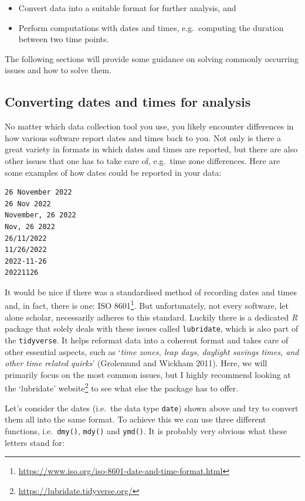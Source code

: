 \documentclass[
  letterpaper,
]{krantz}
\renewcommand{\href}[2]{#2\footnote{\url{#1}}}
\begin{document}
\begin{itemize}
\item
  Convert data into a suitable format for further analysis, and
\item
  Perform computations with dates and times, e.g.~computing the duration
  between two time points.
\end{itemize}

The following sections will provide some guidance on solving commonly
occurring issues and how to solve them.

\subsection{Converting dates and times for
analysis}\label{converting-dates-and-times-for-analysis}

No matter which data collection tool you use, you likely encounter
differences in how various software report dates and times back to you.
Not only is there a great variety in formats in which dates and times
are reported, but there are also other issues that one has to take care
of, e.g.~time zone differences. Here are some examples of how dates
could be reported in your data:

\begin{verbatim}
26 November 2022
26 Nov 2022
November, 26 2022
Nov, 26 2022
26/11/2022
11/26/2022
2022-11-26
20221126
\end{verbatim}

It would be nice if there was a standardised method of recording dates
and times and, in fact, there is one:
\href{https://www.iso.org/iso-8601-date-and-time-format.html}{ISO 8601}.
But unfortunately, not every software, let alone scholar, necessarily
adheres to this standard. Luckily there is a dedicated \emph{R} package
that solely deals with these issues called \texttt{lubridate}, which is
also part of the \texttt{tidyverse}. It helps reformat data into a
coherent format and takes care of other essential aspects, such as
`\emph{time zones, leap days, daylight savings times, and other time
related quirks}' (Grolemund and Wickham 2011). Here, we will primarily
focus on the most common issues, but I highly recommend looking at the
\href{https://lubridate.tidyverse.org/}{`lubridate' website} to see what
else the package has to offer.

Let's consider the dates (i.e.~the data type \texttt{date}) shown above
and try to convert them all into the same format. To achieve this we can
use three different functions, i.e.~\texttt{dmy()}, \texttt{mdy()} and
\texttt{ymd()}. It is probably very obvious what these letters stand
for:
\end{document}
